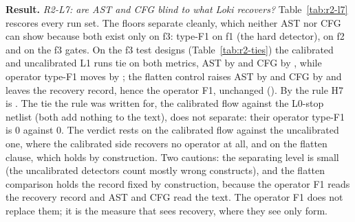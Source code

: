 \documentclass[conference]{IEEEtran}
\newcommand{\hev}[1]{\par\smallskip\noindent\textbf{#1}}
\begin{document}
\hev{Result.} \emph{R2-L7: are AST and CFG blind to what Loki recovers?} Table~\ref{tab:r2-l7} rescores every run set. The floors separate cleanly, which neither
AST nor CFG can show because both exist only on f3: type-F1 \rtLsevenTypeFonek{} on f1 (the
hard detector), \rtLsevenTypeFtwo{} on f2 and \rtLsevenTypeFthree{} on the f3 gates. On the
f3 test designs (Table~\ref{tab:r2-ties}) the calibrated and uncalibrated L1 runs tie on both
metrics, AST by \rtLsevenDAst{} and CFG by \rtLsevenDCfg{}, while operator type-F1 moves by
\rtLsevenDF{}; the flatten control raises AST by \rtLsevenFAst{} and CFG by \rtLsevenFCfg{}
and leaves the recovery record, hence the operator F1, unchanged (\rtLsevenFF{}). By the rule H7 is \rtLsevenStatus{}. The tie the rule was written for, the calibrated flow against
the L0-stop netlist (both add nothing to the text), does not separate: their operator type-F1
is $0$ against $0$. The verdict rests on the calibrated flow against the uncalibrated one,
where the calibrated side recovers no operator at all, and on the flatten clause, which holds
by construction. Two cautions: the separating level is small (the uncalibrated
detectors count mostly wrong constructs), and the flatten comparison holds the record fixed
by construction, because the operator F1 reads the recovery record and AST and CFG read the
text. The operator F1 does not replace them; it is the measure that sees recovery, where
they see only form.



\end{document}
